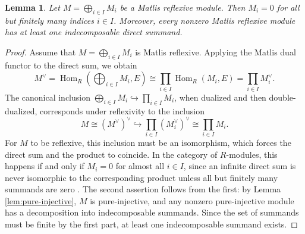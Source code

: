 \documentclass{kms-c}
\theoremstyle{plain}
\newtheorem{lemma}[theorem]{Lemma}
\theoremstyle{definition}
\theoremstyle{remark}
\begin{document}
\begin{lemma}
\label{lem:no-infinite-sums}
Let \( M = \bigoplus_{i \in I} M_i \) be a Matlis reflexive module. Then \( M_i = 0 \) for all but finitely many indices \( i \in I \). Moreover, every nonzero Matlis reflexive module has at least one indecomposable direct summand.
\end{lemma}
\begin{proof}
Assume that \( M = \bigoplus_{i \in I} M_i \) is Matlis reflexive. Applying the Matlis dual functor to the direct sum, we obtain
\[
M^\vee = \operatorname{Hom}_R\left(\bigoplus_{i \in I} M_i, E\right) \cong \prod_{i \in I} \operatorname{Hom}_R(M_i, E) = \prod_{i \in I} M_i^\vee.
\]
The canonical inclusion \( \bigoplus_{i \in I} M_i \hookrightarrow \prod_{i \in I} M_i \), when dualized and then double-dualized, corresponds under reflexivity to the inclusion
\[
M \cong (M^\vee)^\vee \hookrightarrow \prod_{i \in I} (M_i^\vee)^\vee \cong \prod_{i \in I} M_i.
\]
For \( M \) to be reflexive, this inclusion must be an isomorphism, which forces the direct sum and the product to coincide. In the category of \( R \)-modules, this happens if and only if \( M_i = 0 \) for almost all \( i \in I \), since an infinite direct sum is never isomorphic to the corresponding product unless all but finitely many summands are zero \cite[Lemma 2.3]{Krause2025}. The second assertion follows from the first: by Lemma \ref{lem:pure-injective}, \( M \) is pure-injective, and any nonzero pure-injective module has a decomposition into indecomposable summands. Since the set of summands must be finite by the first part, at least one indecomposable summand exists. 
\end{proof}
\end{document}
